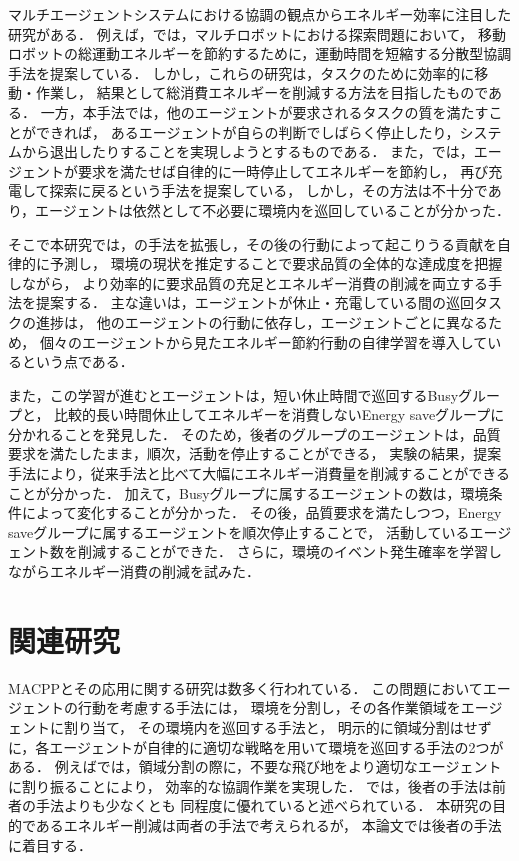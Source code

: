 \documentclass[12pt,a4j,twoside]{jarticle}
\begin{document}
マルチエージェントシステムにおける協調の観点からエネルギー効率に注目した研究\cite{Kim2016,Benkrid2019,Notomista2022}がある．
例えば，\cite{Benkrid2019}では，マルチロボットにおける探索問題において，
移動ロボットの総運動エネルギーを節約するために，運動時間を短縮する分散型協調手法を提案している．
しかし，これらの研究は，タスクのために効率的に移動・作業し，
結果として総消費エネルギーを削減する方法を目指したものである．
一方，本手法では，他のエージェントが要求されるタスクの質を満たすことができれば，
あるエージェントが自らの判断でしばらく停止したり，システムから退出したりすることを実現しようとするものである．
また，\cite{WuPrima2019, Wu2019}では，エージェントが要求を満たせば自律的に一時停止してエネルギーを節約し，
再び充電して探索に戻るという手法を提案している，
しかし，その方法は不十分であり，エージェントは依然として不必要に環境内を巡回していることが分かった．
\par

そこで本研究では，\cite{Wu2019}の手法を拡張し，その後の行動によって起こりうる貢献を自律的に予測し，
環境の現状を推定することで要求品質の全体的な達成度を把握しながら，
より効率的に要求品質の充足とエネルギー消費の削減を両立する手法を提案する．
主な違いは，エージェントが休止・充電している間の巡回タスクの進捗は，
他のエージェントの行動に依存し，エージェントごとに異なるため，
個々のエージェントから見たエネルギー節約行動の自律学習を導入しているという点である．
\par

また，この学習が進むとエージェントは，短い休止時間で巡回するBusyグループと，
比較的長い時間休止してエネルギーを消費しないEnergy saveグループに分かれることを発見した．
そのため，後者のグループのエージェントは，品質要求を満たしたまま，順次，活動を停止することができる，
実験の結果，提案手法により，従来手法と比べて大幅にエネルギー消費量を削減することができることが分かった．
加えて，Busyグループに属するエージェントの数は，環境条件によって変化することが分かった．
その後，品質要求を満たしつつ，Energy saveグループに属するエージェントを順次停止することで，
活動しているエージェント数を削減することができた．
さらに，環境のイベント発生確率を学習しながらエネルギー消費の削減を試みた．
\par

\section{関連研究}
MACPPとその応用に関する研究は数多く行われている．
この問題においてエージェントの行動を考慮する手法には，
環境を分割し，その各作業領域をエージェントに割り当て，
その環境内を巡回する手法\cite{Hattori2021,Mazda2005,Agmon2011,Tevyashov2022,Wiandt2018}と，
明示的に領域分割はせずに，各エージェントが自律的に適切な戦略を用いて環境を巡回する手法の2つがある．
例えば\cite{Hattori2021}では，領域分割の際に，不要な飛び地をより適切なエージェントに割り振ることにより，
効率的な協調作業を実現した．
\cite{Chevaleyre2004}では，後者の手法は前者の手法よりも少なくとも
同程度に優れていると述べられている．
本研究の目的であるエネルギー削減は両者の手法で考えられるが，
本論文では後者の手法に着目する．
\par
\end{document}
